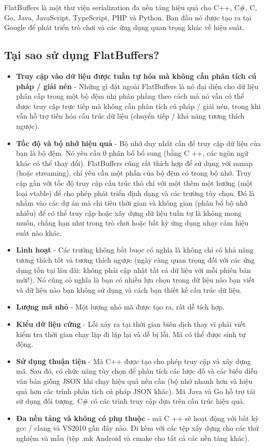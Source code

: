 FlatBuffers là một thư viện serialization đa nền tảng hiệu quả cho C++, C\#, C, Go, Java, JavaScript, TypeScript, PHP và Python. 
Ban đầu nó được tạo ra tại Google để phát triển trò chơi và các ứng dụng quan trọng khác về hiệu suất.
\subsection{Tại sao sử dụng FlatBuffers?}
\begin{itemize}
\item \textbf{Truy cập vào dữ liệu được tuần tự hóa mà không cần phân tích cú pháp / giải nén} 
- Những gì đặt ngoài FlatBuffers là nó đại diện cho dữ liệu phân cấp trong một bộ đệm nhị phân phẳng theo cách mà nó vẫn có thể được truy cập trực tiếp mà không cần phân tích cú pháp / giải nén, trong khi vẫn hỗ trợ tiến hóa cấu trúc dữ liệu (chuyển tiếp / khả năng tương thích ngược).
\item \textbf{Tốc độ và bộ nhớ hiệu quả} 
- Bộ nhớ duy nhất cần để truy cập dữ liệu của bạn là bộ đệm. Nó yêu cầu 0 phân bổ bổ sung (bằng C ++, các ngôn ngữ khác có thể thay đổi). FlatBuffers cũng rất thích hợp để sử dụng với mmap (hoặc streaming), chỉ yêu cầu một phần của bộ đệm có trong bộ nhớ. Truy cập gần với tốc độ truy cập cấu trúc thô chỉ với một thêm một hướng (một loại vtable) để cho phép phát triển định dạng và các trường tùy chọn. Đó là nhằm vào các dự án mà chi tiêu thời gian và không gian (phân bổ bộ nhớ nhiều) để có thể truy cập hoặc xây dựng dữ liệu tuần tự là không mong muốn, chẳng hạn như trong trò chơi hoặc bất kỳ ứng dụng nhạy cảm hiệu suất nào khác.
\item \textbf{Linh hoạt} 
- Các trường không bắt buọc có nghĩa là không chỉ có khả năng tương thích tốt và tương thích ngược (ngày càng quan trọng đối với các ứng dụng tồn tại lâu dài: không phải cập nhật tất cả dữ liệu với mỗi phiên bản mới!). Nó cũng có nghĩa là bạn có nhiều lựa chọn trong dữ liệu nào bạn viết và dữ liệu nào bạn không sử dụng và cách bạn thiết kế cấu trúc dữ liệu.
\item \textbf{Lượng mã nhỏ} 
- Một lượng nhỏ mã được tạo ra, rất dễ tích hợp.
\item \textbf{Kiểu dữ liệu cứng} 
- Lỗi xảy ra tại thời gian biên dịch thay vì phải viết kiểm tra thời gian chạy lặp đi lặp lại và dễ bị lỗi. Mã có thể được sinh tự động.
\item \textbf{Sử dụng thuận tiện} 
- Mã C++ được tạo cho phép truy cập và xây dựng mã. Sau đó, có chức năng tùy chọn để phân tích các lược đồ và các biểu diễn văn bản giống JSON khi chạy hiệu quả nếu cần (bộ nhớ nhanh hơn và hiệu quả hơn các trình phân tích cú pháp JSON khác).
\newline 
Mã Java và Go hỗ trợ tái sử dụng đối tượng. C\# có các trình truy cập dựa trên cấu trúc hiệu quả.
\item \textbf{Đa nền tảng và không có phụ thuộc} 
- mã C ++ sẽ hoạt động với bất kỳ gcc / clang và VS2010 gần đây nào. Đi kèm với các tệp xây dựng cho các thử nghiệm và mẫu (tệp .mk Android và cmake cho tất cả các nền tảng khác).
\end{itemize}